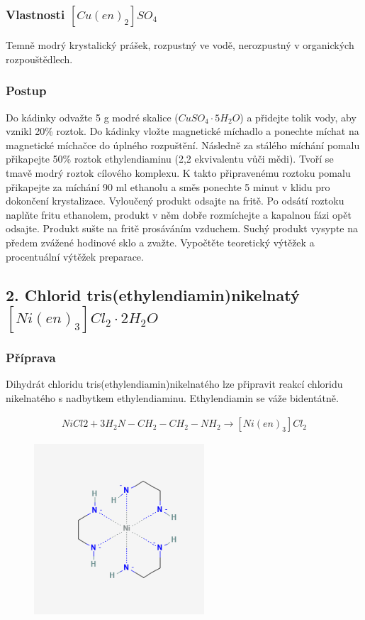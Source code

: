 \documentclass[13pt, a4paper, twoside]{article}
\begin{document}
\subsubsection*{Vlastnosti $[Cu(en)_2]SO_4$}
Temně modrý krystalický prášek, rozpustný ve vodě, nerozpustný v organických rozpouštědlech.

\subsubsection*{Postup}
Do kádinky odvažte 5 g modré skalice ($CuSO_4 \cdot 5H_2O$) a přidejte tolik vody, aby vznikl 20\%
roztok. Do kádinky vložte magnetické míchadlo a ponechte míchat na magnetické míchačce do úplného rozpuštění. Následně za stálého míchání pomalu přikapejte 50\% 
roztok ethylendiaminu (2,2 ekvivalentu vůči mědi). Tvoří se tmavě modrý roztok cílového komplexu. K takto připravenému roztoku pomalu přikapejte za míchání 90 ml 
ethanolu a směs ponechte 5 minut v klidu pro dokončení krystalizace. Vyloučený produkt odsajte na fritě. Po odsátí roztoku naplňte fritu ethanolem, produkt v něm 
dobře rozmíchejte a kapalnou fázi opět odsajte. Produkt sušte na fritě prosáváním vzduchem. Suchý produkt vysypte na předem zvážené hodinové sklo a zvažte. 
Vypočtěte teoretický výtěžek a procentuální výtěžek preparace.

\subsection*{2. Chlorid tris(ethylendiamin)nikelnatý $[Ni(en)_3]Cl_2 \cdot 2H_2O$}
\subsubsection*{Příprava}
Dihydrát chloridu tris(ethylendiamin)nikelnatého lze připravit reakcí chloridu nikelnatého s nadbytkem ethylendiaminu. Ethylendiamin se váže bidentátně.


\begin{align*}
    NiCl2 + 3H_2N-CH_2-CH_2-NH_2 \to [Ni(en)_3]Cl_2
\end{align*}

\begin{figure}[H]
    \centering
    \includegraphics*[width=2.5in]{nickelII.png}
\end{figure}
\end{document}
